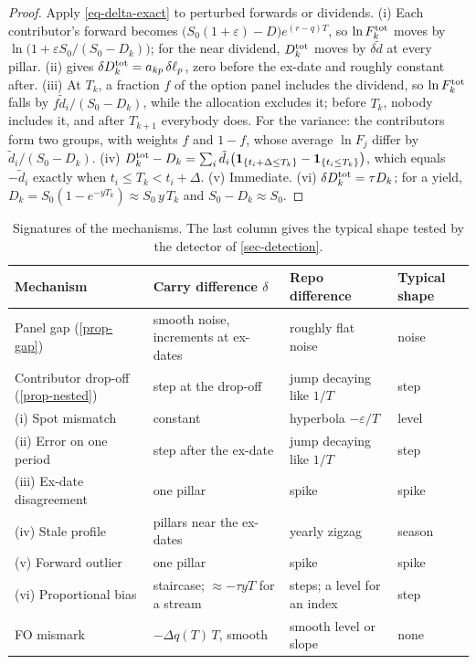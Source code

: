 \begin{proof}
Apply \eqref{eq-delta-exact} to perturbed forwards or dividends.
(i) Each contributor's forward becomes $\bigl(S_0(1+\varepsilon)-D\bigr)e^{(r-q)T}$, so $\ln F^{\mathrm{tot}}_k$ moves by
$\ln\bigl(1+\varepsilon S_0/(S_0-D_k)\bigr)$; for the near dividend, $D^{\mathrm{tot}}_k$ moves by $\delta\tilde d$ at every
pillar.
(ii)  gives $\delta D^{\mathrm{tot}}_k=a_{kp}\,\delta\ell_p$, zero before the ex-date and roughly constant
after.
(iii) At $T_k$, a fraction $f$ of the option panel includes the dividend, so $\ln F^{\mathrm{tot}}_k$ falls by
$f\tilde d_i/(S_0-D_k)$, while the allocation excludes it; before $T_k$, nobody includes it, and after $T_{k+1}$
everybody does. For the variance: the contributors form two groups, with weights $f$ and $1-f$, whose average
$\ln F_j$ differ by $\tilde d_i/(S_0-D_k)$.
(iv) $D^{\mathrm{tot}}_k-D_k=\sum_i\tilde d_i\bigl(\mathbf{1}_{\{t_i+\Delta\le T_k\}}-\mathbf{1}_{\{t_i\le T_k\}}\bigr)$, which equals
$-\tilde d_i$ exactly when $t_i\le T_k<t_i+\Delta$.
(v) Immediate. (vi) $\delta D^{\mathrm{tot}}_k=\tau D_k$; for a yield, $D_k=S_0(1-e^{-yT_k})\approx S_0\,y\,T_k$ and
$S_0-D_k\approx S_0$.
\end{proof}

\begin{table}[ht]
\centering
\caption{Signatures of the mechanisms. The last column gives the typical shape tested by the detector of
\cref{sec-detection}.}
\label{tab-signatures}
\small
\begin{tabular}{@{}>{\raggedright\arraybackslash}p{4.2cm}>{\raggedright\arraybackslash}p{4.3cm}
>{\raggedright\arraybackslash}p{3.6cm}l@{}}
\toprule
Mechanism & Carry difference $\delta$ & Repo difference & Typical shape\\
\midrule
Panel gap (\ref{prop-gap}) & smooth noise, increments at ex-dates & roughly flat noise & noise\\
Contributor drop-off (\ref{prop-nested}) & step at the drop-off & jump decaying like $1/T$ & step\\
(i) Spot mismatch & constant & hyperbola $-\varepsilon/T$ & level\\
(ii) Error on one period & step after the ex-date & jump decaying like $1/T$ & step\\
(iii) Ex-date disagreement & one pillar & spike & spike\\
(iv) Stale profile & pillars near the ex-dates & yearly zigzag & season\\
(v) Forward outlier & one pillar & spike & spike\\
(vi) Proportional bias & staircase; $\approx-\tau yT$ for a stream & steps; a level for an index & step\\
FO mismark & $-\Delta q(T)\,T$, smooth & smooth level or slope & none\\
\bottomrule
\end{tabular}
\end{table}

